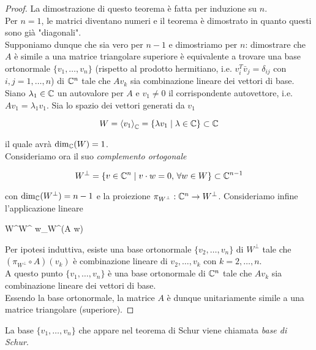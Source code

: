 \begin{proof}
	La dimostrazione di questo teorema è fatta per induzione su $ n $.\\
	Per $ n=1 $, le matrici diventano numeri e il teorema è dimostrato in quanto questi sono già "diagonali".\\
	Supponiamo dunque che sia vero per $ n-1 $ e dimostriamo per $ n $: dimostrare che $ A $ è simile a una matrice triangolare superiore è equivalente a trovare una base ortonormale $ \{v_{1},\dots,v_{n}\} $ (rispetto al prodotto hermitiano, i.e. $ v_{i}^{T} \bar{v}_{j} = \delta_{ij} $ con $ i,j=1,\dots,n $) di $ \mathbb{C}^{n} $ tale che $ A v_{k} $ sia combinazione lineare dei vettori di base.\\
	Siano $ \lambda_{1} \in \mathbb{C} $ un autovalore per $ A $ e $ v_{1} \neq 0 $ il corrispondente autovettore, i.e. $ A v_{1} = \lambda_{1} v_{1} $. Sia lo spazio dei vettori generati da $ v_{1} $
	
	\begin{equation}
		W = \ev{v_{1}}_{\C} = \{ \lambda v_{1} \mid \lambda \in \C \} \subset \C
	\end{equation}
	
	il quale avrà $ \dim_{\mathbb{C}}(W) = 1 $.\\
	Consideriamo ora il suo \textit{complemento ortogonale}
	
	\begin{equation}
		W^{\perp} = \{ v\in \mathbb{C}^{n} \mid v \cdot w = 0, \, \forall w \in W \} \subset \mathbb{C}^{n-1}
	\end{equation}

	con $ \dim_{\mathbb{C}}(W^{\perp}) = n-1 $ e la proiezione $ \pi_{W^{\perp}} : \mathbb{C}^{n} \to W^{\perp} $. Consideriamo infine l'applicazione lineare
	
		{W^{\perp}}{W^{\perp}}
		{w}{\pi_{W^{\perp}}(A w)}
	
	Per ipotesi induttiva, esiste una base ortonormale $ \{v_{2},\dots,v_{n}\} $ di $ W^{\perp} $ tale che $ (\pi_{W^{\perp}} \circ A)(v_{k}) $ è combinazione lineare di $ v_{2},\dots,v_{k} $ con $ k=2,\dots,n $.\\
	A questo punto $ \{v_{1},\dots,v_{n}\} $ è una base ortonormale di $ \mathbb{C}^{n} $ tale che $ A v_{k} $ sia combinazione lineare dei vettori di base.\\
	Essendo la base ortonormale, la matrice $ A $ è dunque unitariamente simile a una matrice triangolare (superiore).
\end{proof}

\begin{remark}
	La base $ \{v_{1},\dots,v_{n}\} $ che appare nel teorema di Schur viene chiamata \textit{base di Schur}.
\end{remark}

